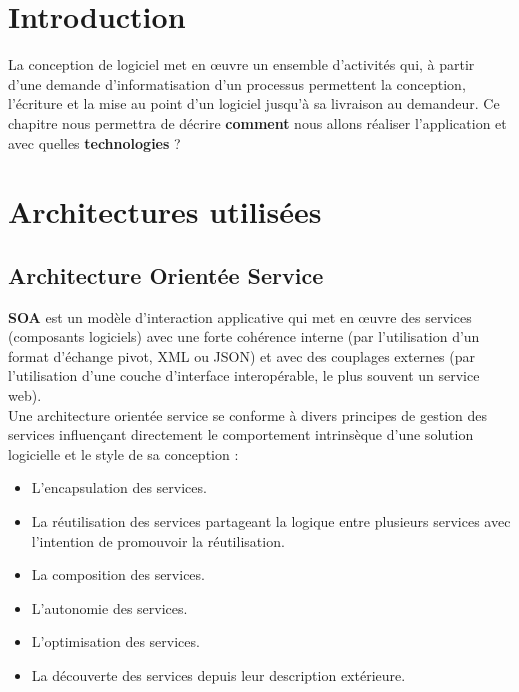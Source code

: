 \documentclass[12pt]{report}
\begin{document}
      \section{Introduction}
	La conception de logiciel met en œuvre un ensemble d'activités qui, à partir d'une demande d'informatisation d'un processus permettent la conception, l'écriture et la mise au point d'un logiciel jusqu'à sa livraison au demandeur. Ce chapitre nous permettra de décrire \textbf{comment} nous allons réaliser l'application et avec quelles \textbf{technologies} ? \cite{diagramme_classes}
	
      \section{Architectures utilisées}
	\subsection{Architecture Orientée Service}
	    \textbf{\gls{SOA}} est un modèle d'interaction applicative qui met en œuvre des services (composants logiciels) avec une forte cohérence interne (par l'utilisation d'un format d'échange pivot, \gls{XML} ou \gls{JSON}) et avec des couplages externes (par l'utilisation d'une couche d'interface interopérable, le plus souvent un service web).
	    \\Une architecture orientée service se conforme à divers principes de gestion des services influençant directement le comportement intrinsèque d’une solution logicielle et le style de sa conception :\cite{soa}
	      \begin{itemize}
		\item L’encapsulation des services.
		\item La réutilisation des services partageant la logique entre plusieurs services avec l’intention de promouvoir la réutilisation.
		\item La composition des services.
		\item L’autonomie des services.
		\item L’optimisation des services.
		\item La découverte des services depuis leur description extérieure.
	      \end{itemize}
	      
\end{document}

